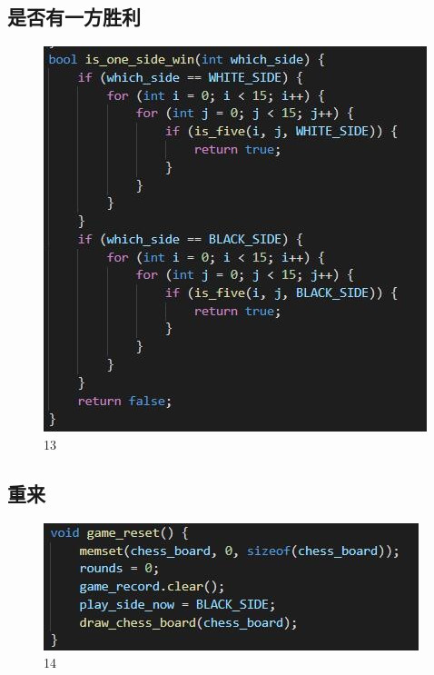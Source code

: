 \documentclass[UTF8]{ctexart}
\begin{document}
\subsection{是否有一方胜利}
\begin{figure}[H]
    \centering
    \includegraphics[scale=0.7]{12.jpg}
\caption{13}
\end{figure}
\subsection{重来}
\begin{figure}[H]
    \centering
    \includegraphics[scale=1.0]{13.jpg}
\caption{14}
\end{figure}
\end{document}

